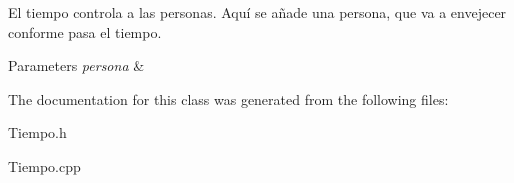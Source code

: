 El tiempo controla a las personas. Aquí se añade una persona, que va a envejecer conforme pasa el tiempo. 
\begin{DoxyParams}{Parameters}
{\em persona} & \\
\hline
\end{DoxyParams}


The documentation for this class was generated from the following files\+:\begin{DoxyCompactItemize}
\item 
Tiempo.\+h\item 
Tiempo.\+cpp\end{DoxyCompactItemize}
